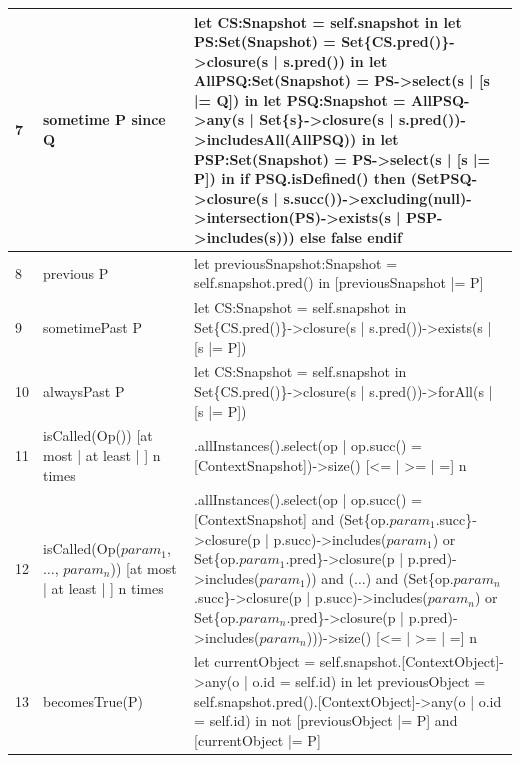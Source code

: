 \begin{table}[htbp]
\begin{tabularx}{\textwidth}{|>{\footnotesize}p{0.6cm}|>{\scriptsize\raggedright\arraybackslash}p{4cm}|>{\scriptsize\raggedright\arraybackslash}X|}
    \hline
    7 &
    sometime P since Q &
    let CS:Snapshot = self.snapshot
    in let PS:Set(Snapshot) = Set\{CS.pred()\}->closure(s | s.pred())
    in let AllPSQ:Set(Snapshot) = PS->select(s | [s |= Q])
    in let PSQ:Snapshot = AllPSQ->any(s | Set\{s\}->closure(s | s.pred())->includesAll(AllPSQ))
    in let PSP:Set(Snapshot) = PS->select(s | [s |= P])
    in if PSQ.isDefined() then (Set{PSQ}->closure(s | s.succ())->excluding(null)->intersection(PS)->exists(s | PSP->includes(s))) else false endif \\ 
    \hline
    8 &
    previous P &
    let previousSnapshot:Snapshot = self.snapshot.pred() in [previousSnapshot |= P] \\
    \hline
    9 &
    sometimePast P &
    let CS:Snapshot = self.snapshot in Set\{CS.pred()\}->closure(s | s.pred())->exists(s | [s |= P]) \\
    \hline
    10 &
    alwaysPast P &
    let CS:Snapshot = self.snapshot in Set\{CS.pred()\}->closure(s | s.pred())->forAll(s | [s |= P]) \\
    \hline
    11 &
    isCalled(Op()) [at most | at least | ] n times &
    [OpClassName].allInstances().select(op | op.succ() = [ContextSnapshot])->size() [<= | >= | =] n \\
    \hline
    12 &
    isCalled(Op($param_1$, $\ldots$, $param_n$)) [at most | at least | ] n times &
    [OpClassName].allInstances().select(op | op.succ() = [ContextSnapshot] and
    (Set\{op.$param_1$.succ\}->closure(p | p.succ)->includes($param_1$) or Set\{op.$param_1$.pred\}->closure(p | p.pred)->includes($param_1$)) 
    and ($\ldots$) 
    and (Set\{op.$param_n$.succ\}->closure(p | p.succ)->includes($param_n$) or Set\{op.$param_n$.pred\}->closure(p | p.pred)->includes($param_n$)))->size() [<= | >= | =] n \\
    \hline
    13 &
    becomesTrue(P) &
    let currentObject = self.snapshot.[ContextObject]->any(o | o.id = self.id) in
    let previousObject = self.snapshot.pred().[ContextObject]->any(o | o.id = self.id) in 
    not [previousObject |= P] and [currentObject |= P] \\
    \hline
\end{tabularx}
\end{table}
